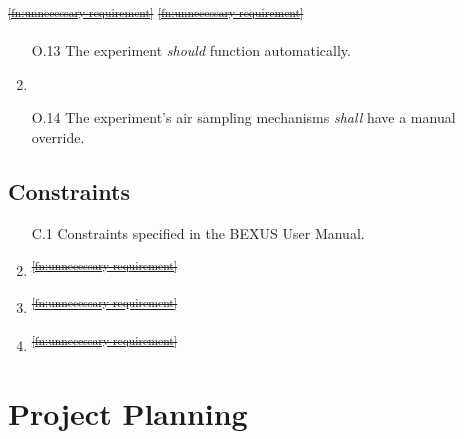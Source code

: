 \documentclass[a4paper,12pt,twoside]{article}
\providecommand{\DIFdeltex}[1]{{\protect\color{red}\sout{#1}}}                      %
\providecommand{\DIFaddbegin}{} %
\providecommand{\DIFaddend}{} %
\providecommand{\DIFdelbegin}{} %
\providecommand{\DIFdelend}{} %
\providecommand{\DIFdel}[1]{\texorpdfstring{\DIFdeltex{#1}}{}} %
\newcommand{\DIFscaledelfig}{0.5}
\newlength{\DIFdelgraphicswidth} %
\newlength{\DIFdelgraphicsheight} %
\newcommand{\DIFaddincludegraphics}[2][]{{\color{blue}\fbox{\DIFOincludegraphics[#1]{#2}}}} %
\newcommand{\DIFdelincludegraphics}[2][]{%
\sbox{\DIFdelgraphicsbox}{\DIFOincludegraphics[#1]{#2}}%
\settoboxwidth{\DIFdelgraphicswidth}{\DIFdelgraphicsbox} %
\settoboxtotalheight{\DIFdelgraphicsheight}{\DIFdelgraphicsbox} %
\scalebox{\DIFscaledelfig}{%
\parbox[b]{\DIFdelgraphicswidth}{\usebox{\DIFdelgraphicsbox}\\[-\baselineskip] \rule{\DIFdelgraphicswidth}{0em}}\llap{\resizebox{\DIFdelgraphicswidth}{\DIFdelgraphicsheight}{%
\setlength{\unitlength}{\DIFdelgraphicswidth}%
\begin{picture}(1,1)%
\thicklines\linethickness{2pt} %
{\color[rgb]{1,0,0}\put(0,0){\framebox(1,1){}}}%
{\color[rgb]{1,0,0}\put(0,0){\line( 1,1){1}}}%
{\color[rgb]{1,0,0}\put(0,1){\line(1,-1){1}}}%
\end{picture}%
}\hspace*{3pt}}} %
} %
\DeclareRobustCommand{\DIFaddbegin}{\DIFOaddbegin \let\includegraphics\DIFaddincludegraphics} %
\DeclareRobustCommand{\DIFaddend}{\DIFOaddend \let\includegraphics\DIFOincludegraphics} %
\DeclareRobustCommand{\DIFdelbegin}{\DIFOdelbegin \let\includegraphics\DIFdelincludegraphics} %
\DeclareRobustCommand{\DIFdelend}{\DIFOaddend \let\includegraphics\DIFOincludegraphics} %
\begin{document}
\DIFdel{\textsuperscript{\ref{fn:unnecessary-requirement}}
    }%
\DIFdel{\textsuperscript{\ref{fn:unnecessary-requirement}}
    }%
\DIFdelend \DIFaddbegin \begin{enumerate}
    \item[O.13] \DIFaddend The experiment \textit{should} function automatically.
    \DIFdelbegin %
\item%
\DIFdelend \DIFaddbegin \item[O.14] \DIFaddend The experiment's air sampling mechanisms \textit{shall} have a manual override.
\end{enumerate} 
\DIFdelbegin %
\DIFdelend \subsection{Constraints}

\DIFdelbegin %
\DIFdelend \DIFaddbegin \begin{enumerate}
    \item[C.1] \DIFaddend Constraints specified in the BEXUS User Manual.
\DIFdelbegin %
\item%
\DIFdel{\textsuperscript{\ref{fn:unnecessary-requirement}}
    }%
\item%
\DIFdel{\textsuperscript{\ref{fn:unnecessary-requirement}}
    }%
\item%
\DIFdel{\textsuperscript{\ref{fn:unnecessary-requirement}}
}\DIFdelend \end{enumerate}



\pagebreak
\section{Project Planning}
\end{document}
